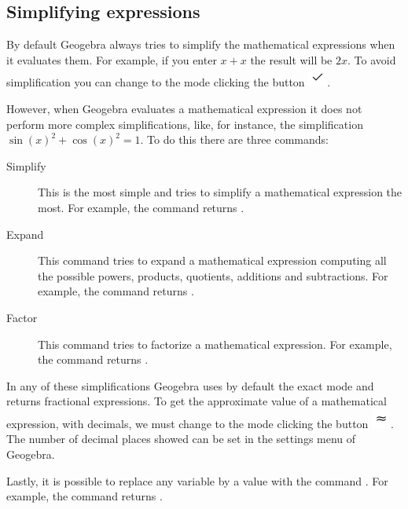 \subsection*{Simplifying expressions}
By default Geogebra always tries to simplify the mathematical expressions when it evaluates them.
For example, if you enter $x+x$ the result will be $2x$.
To avoid simplification you can change to the  mode clicking the button \includegraphics[scale=0.03]{img/introduction/keep-input-button}.

However, when Geogebra evaluates a mathematical expression it does not perform more complex simplifications, like, for instance, the simplification $\sin(x)^2+\cos(x)^2=1$.
To do this there are three commands:
\begin{description}
\item[Simplify] This is the most simple and tries to simplify a mathematical expression the most.
      For example, the command  returns .
\item[Expand] This command tries to expand a mathematical expression computing all the possible powers, products, quotients, additions and subtractions.
      For example, the command  returns .
\item[Factor] This command tries to factorize a mathematical expression.
      For example, the command  returns .
\end{description}

In any of these simplifications Geogebra uses by default the exact mode and returns fractional expressions.
To get the approximate value of a mathematical expression, with decimals, we must change to the  mode clicking the button \includegraphics[scale=0.03]{img/introduction/approximate-button}.
The number of decimal places showed can be set in the settings menu of Geogebra.

Lastly, it is possible to replace any variable by a value with the command .
For example, the command  returns .


